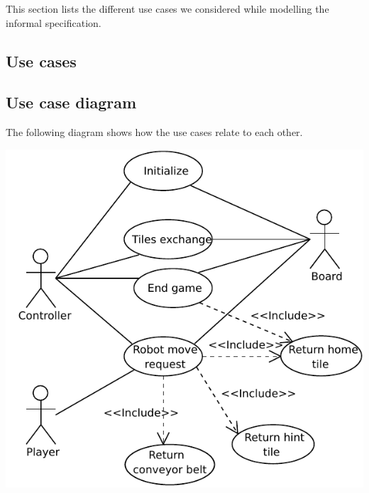 This section lists the different use cases we considered while modelling the informal specification.
\subsection{Use cases}
	
\subsection{Use case diagram}
	\begin{minipage}{\linewidth}
		The following diagram shows how the use cases relate to each other.

		\includegraphics[width=\linewidth]{usecases/diagram.pdf}
	\end{minipage}
